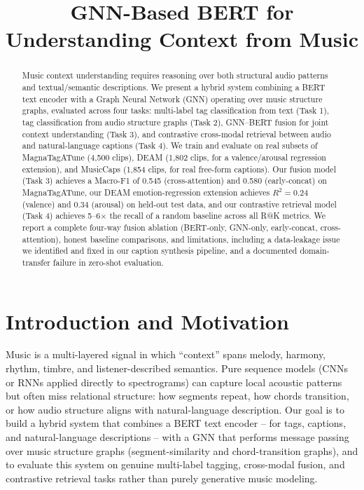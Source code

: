 \documentclass[conference]{IEEEtran}
\begin{document}
\title{GNN-Based BERT for Understanding Context from Music}

\author{
}

\maketitle

\begin{abstract}
Music context understanding requires reasoning over both structural
audio patterns and textual/semantic descriptions. We present a hybrid
system combining a BERT text encoder with a Graph Neural Network (GNN)
operating over music structure graphs, evaluated across four tasks:
multi-label tag classification from text (Task 1), tag classification
from audio structure graphs (Task 2), GNN--BERT fusion for joint
context understanding (Task 3), and contrastive cross-modal retrieval
between audio and natural-language captions (Task 4). We train and
evaluate on real subsets of MagnaTagATune (4{,}500 clips), DEAM
(1{,}802 clips, for a valence/arousal regression extension), and
MusicCaps (1{,}854 clips, for real free-form captions). Our fusion
model (Task 3) achieves a Macro-F1 of 0.545 (cross-attention) and 0.580
(early-concat) on MagnaTagATune, our DEAM emotion-regression extension
achieves $R^2 = 0.24$ (valence) and $0.34$ (arousal) on held-out test
data, and our contrastive retrieval model (Task 4) achieves 5--6$\times$
the recall of a random baseline across all R@K metrics. We report a
complete four-way fusion ablation (BERT-only, GNN-only, early-concat,
cross-attention), honest baseline comparisons, and limitations,
including a data-leakage issue we identified and fixed in our caption
synthesis pipeline, and a documented domain-transfer failure in
zero-shot evaluation.
\end{abstract}

\section{Introduction and Motivation}

Music is a multi-layered signal in which ``context'' spans melody,
harmony, rhythm, timbre, and listener-described semantics. Pure
sequence models (CNNs or RNNs applied directly to spectrograms) can
capture local acoustic patterns but often miss relational structure:
how segments repeat, how chords transition, or how audio structure
aligns with natural-language description. Our goal is to build a
hybrid system that combines a BERT text encoder -- for tags, captions,
and natural-language descriptions -- with a GNN that performs message
passing over music structure graphs (segment-similarity and
chord-transition graphs), and to evaluate this system on genuine
multi-label tagging, cross-modal fusion, and contrastive retrieval
tasks rather than purely generative music modeling.
\end{document}
